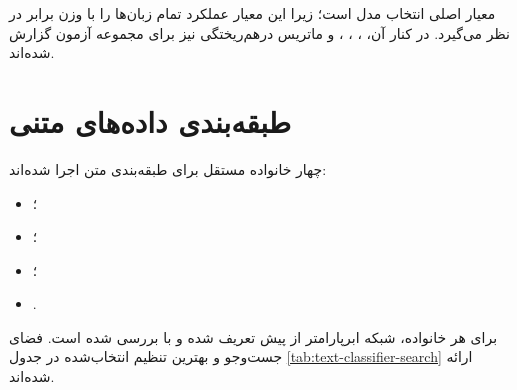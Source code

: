 معیار اصلی انتخاب مدل
است؛ زیرا این معیار عملکرد تمام زبان‌ها را با وزن برابر در نظر می‌گیرد. در کنار آن،
،
،
،
و ماتریس درهم‌ریختگی نیز برای مجموعه آزمون گزارش شده‌اند.


\section{طبقه‌بندی داده‌های متنی}

چهار خانواده مستقل برای طبقه‌بندی متن اجرا شده‌اند:

\begin{itemize}
	\item {}؛
	\item {}؛
	\item {}؛
	\item {}.
\end{itemize}

برای هر خانواده، شبکه ابرپارامتر از پیش تعریف شده و با
بررسی شده است. فضای جست‌وجو و بهترین تنظیم انتخاب‌شده در جدول
\ref{tab:text-classifier-search}
ارائه شده‌اند.

\begin{table}[H]
\centering
\caption{فضای جست‌وجو و بهترین ابرپارامترهای طبقه‌بندهای متن}
\label{tab:text-classifier-search}
\small
{}
\end{table}

